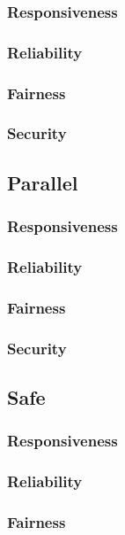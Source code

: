                 \subsubsection{Responsiveness}
                \subsubsection{Reliability}
                \subsubsection{Fairness}
                \subsubsection{Security}
            \subsection{Parallel}
                \subsubsection{Responsiveness}
                \subsubsection{Reliability}
                \subsubsection{Fairness}
                \subsubsection{Security}
            \subsection{Safe}
                \subsubsection{Responsiveness}
                \subsubsection{Reliability}
                \subsubsection{Fairness}
